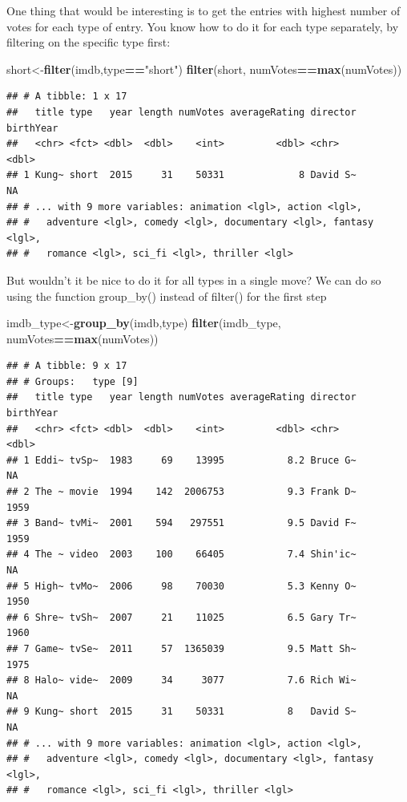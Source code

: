 \documentclass[]{book}
\newenvironment{Shaded}{\begin{snugshade}}{\end{snugshade}}
\newcommand{\KeywordTok}[1]{\textcolor[rgb]{0.13,0.29,0.53}{\textbf{#1}}}
\newcommand{\NormalTok}[1]{#1}
\newcommand{\OperatorTok}[1]{\textcolor[rgb]{0.81,0.36,0.00}{\textbf{#1}}}
\newcommand{\StringTok}[1]{\textcolor[rgb]{0.31,0.60,0.02}{#1}}
\begin{document}
One thing that would be interesting is to get the entries with highest number of votes for each type of entry. You know how to do it for each type separately, by filtering on the specific type first:

\begin{Shaded}
\begin{Highlighting}[]
\NormalTok{short<-}\KeywordTok{filter}\NormalTok{(imdb,type}\OperatorTok{==}\StringTok{"short"}\NormalTok{)}
\KeywordTok{filter}\NormalTok{(short, numVotes}\OperatorTok{==}\KeywordTok{max}\NormalTok{(numVotes))}
\end{Highlighting}
\end{Shaded}

\begin{verbatim}
## # A tibble: 1 x 17
##   title type   year length numVotes averageRating director birthYear
##   <chr> <fct> <dbl>  <dbl>    <int>         <dbl> <chr>        <dbl>
## 1 Kung~ short  2015     31    50331             8 David S~        NA
## # ... with 9 more variables: animation <lgl>, action <lgl>,
## #   adventure <lgl>, comedy <lgl>, documentary <lgl>, fantasy <lgl>,
## #   romance <lgl>, sci_fi <lgl>, thriller <lgl>
\end{verbatim}

But wouldn't it be nice to do it for all types in a single move? We can do so using the function group\_by() instead of filter() for the first step

\begin{Shaded}
\begin{Highlighting}[]
\NormalTok{imdb_type<-}\KeywordTok{group_by}\NormalTok{(imdb,type)}
\KeywordTok{filter}\NormalTok{(imdb_type, numVotes}\OperatorTok{==}\KeywordTok{max}\NormalTok{(numVotes))}
\end{Highlighting}
\end{Shaded}

\begin{verbatim}
## # A tibble: 9 x 17
## # Groups:   type [9]
##   title type   year length numVotes averageRating director birthYear
##   <chr> <fct> <dbl>  <dbl>    <int>         <dbl> <chr>        <dbl>
## 1 Eddi~ tvSp~  1983     69    13995           8.2 Bruce G~        NA
## 2 The ~ movie  1994    142  2006753           9.3 Frank D~      1959
## 3 Band~ tvMi~  2001    594   297551           9.5 David F~      1959
## 4 The ~ video  2003    100    66405           7.4 Shin'ic~        NA
## 5 High~ tvMo~  2006     98    70030           5.3 Kenny O~      1950
## 6 Shre~ tvSh~  2007     21    11025           6.5 Gary Tr~      1960
## 7 Game~ tvSe~  2011     57  1365039           9.5 Matt Sh~      1975
## 8 Halo~ vide~  2009     34     3077           7.6 Rich Wi~        NA
## 9 Kung~ short  2015     31    50331           8   David S~        NA
## # ... with 9 more variables: animation <lgl>, action <lgl>,
## #   adventure <lgl>, comedy <lgl>, documentary <lgl>, fantasy <lgl>,
## #   romance <lgl>, sci_fi <lgl>, thriller <lgl>
\end{verbatim}
\end{document}

